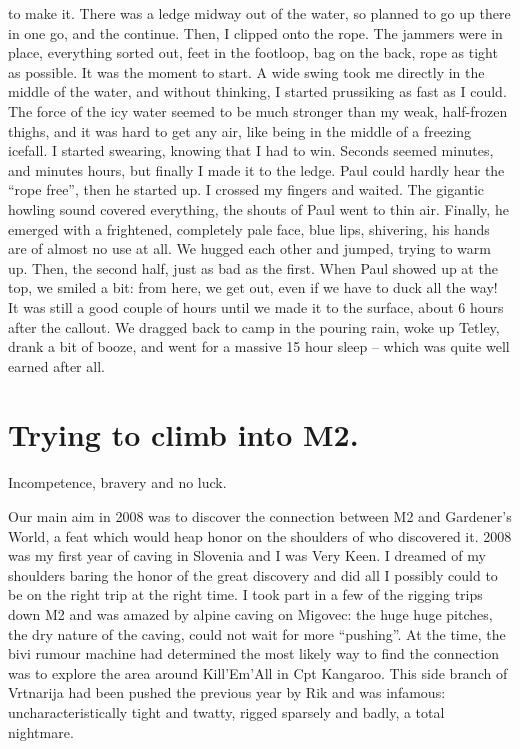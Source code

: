 to make it. There was a ledge midway out of the water, so planned to go
up there in one go, and the continue. Then, I clipped onto the rope. The
jammers were in place, everything sorted out, feet in the footloop, bag
on the back, rope as tight as possible. It was the moment to start. A
wide swing took me directly in the middle of the water, and without
thinking, I started prussiking as fast as I could. The force of the icy
water seemed to be much stronger than my weak, half-frozen thighs, and
it was hard to get any air, like being in the middle of a freezing
icefall. I started swearing, knowing that I had to win. Seconds seemed
minutes, and minutes hours, but finally I made it to the ledge. Paul
could hardly hear the ``rope free'', then he started up. I crossed my
fingers and waited. The gigantic howling sound covered everything, the
shouts of Paul went to thin air. Finally, he emerged with a frightened,
completely pale face, blue lips, shivering, his hands are of almost no
use at all. We hugged each other and jumped, trying to warm up. Then,
the second half, just as bad as the first. When Paul showed up at the
top, we smiled a bit: from here, we get out, even if we have to duck all
the way! It was still a good couple of hours until we made it to the
surface, about 6 hours after the callout. We dragged back to camp in the
pouring rain, woke up Tetley, drank a bit of booze, and went for a
massive 15 hour sleep -- which was quite well earned after all.


\section{Trying to climb into M2.}\label{trying-to-climb-into-m2.}

Incompetence, bravery and no luck.

Our main aim in 2008 was to discover the connection between M2 and
Gardener's World, a feat which would heap honor on the shoulders of who
discovered it. 2008 was my first year of caving in Slovenia and I was
Very Keen. I dreamed of my shoulders baring the honor of the great
discovery and did all I possibly could to be on the right trip at the
right time. I took part in a few of the rigging trips down M2 and was
amazed by alpine caving on Migovec: the huge huge pitches, the dry
nature of the caving, could not wait for more ``pushing''. At the time,
the bivi rumour machine had determined the most likely way to find the
connection was to explore the area around Kill'Em'All in Cpt Kangaroo.
This side branch of Vrtnarija had been pushed the previous year by Rik
and was infamous: uncharacteristically tight and twatty, rigged sparsely
and badly, a total nightmare.

